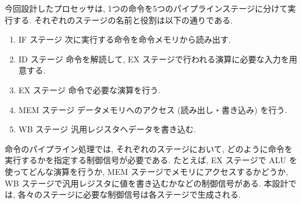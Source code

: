 \documentclass[../specifications.tex]{subfiles}
\begin{document}
  今回設計したプロセッサは, 1つの命令を5つのパイプラインステージに分けて実行する.
  それぞれのステージの名前と役割は以下の通りである.
  \begin{enumerate}
    \item IF ステージ
    \newline 次に実行する命令を命令メモリから読み出す.

    \item ID ステージ
    \newline 命令を解読して, EX ステージで行われる演算に必要な入力を用意する.

    \item EX ステージ
    \newline 命令で必要な演算を行う.

    \item MEM ステージ
    \newline データメモリへのアクセス (読み出し・書き込み) を行う.

    \item WB ステージ
    \newline 汎用レジスタへデータを書き込む.
  \end{enumerate}

  命令のパイプライン処理では, それぞれのステージにおいて, 
  どのように命令を実行するかを指定する制御信号が必要である.
  たとえば, EX ステージで ALU を使ってどんな演算を行うか, 
  MEM ステージでメモリにアクセスするかどうか, 
  WB ステージで汎用レジスタに値を書き込むかなどの制御信号がある.
  本設計では, 各々のステージに必要な制御信号は各ステージで生成される.

  
\end{document}
